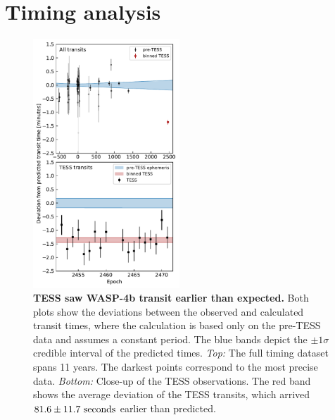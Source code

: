 \documentclass[12pt,twocolumn,tighten]{aastex62}
\begin{document}
\section{Timing analysis}
\label{sec:timing}

\begin{figure}[t]
    \begin{center}
        \leavevmode
        \includegraphics[width=0.49\textwidth]{f3.pdf}
    \end{center}
    \vspace{-0.6cm}
    \caption{ {\bf TESS saw WASP-4b transit earlier than expected.}
      Both plots show the deviations between the observed and
      calculated transit times, where the calculation is based only on
      the pre-TESS data and assumes a constant period.  The blue bands
      depict the $\pm$$1\sigma$ credible interval of the predicted
      times.  {\it Top:} The full timing dataset spans 11 years. The
      darkest points correspond to the most precise data.  {\it
        Bottom:} Close-up of the TESS observations. The red band shows
      the average deviation of the TESS transits, which arrived $81.6 \pm
      11.7\ {\rm seconds}$ earlier than predicted.
        \label{fig:arrived_early}
    }
\end{figure}
\end{document}
